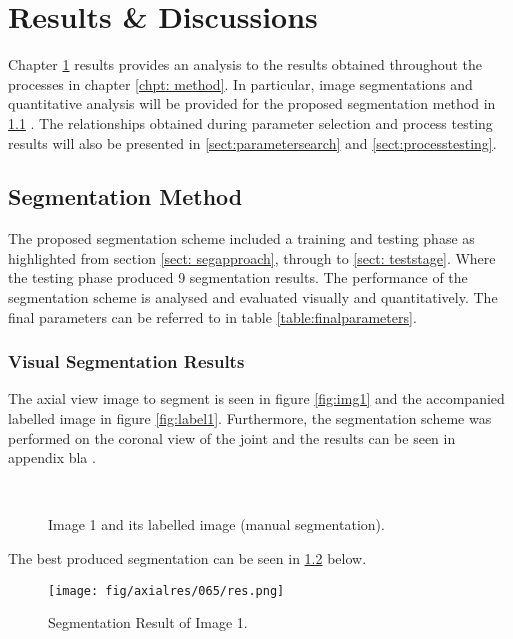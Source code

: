 \chapter{Results \& Discussions}
\label{chpt: results}
Chapter \ref{chpt: results} results provides an analysis to the results obtained throughout the processes in chapter \ref{chpt: method}. In particular, image segmentations and quantitative analysis  will be provided for the proposed segmentation method in \ref{sect:segmentationmethod} . The relationships obtained during parameter selection and process testing results will also be presented in 
\ref{sect:parametersearch} and \ref{sect:processtesting}.

\section{Segmentation Method}
\label{sect:segmentationmethod}
The proposed segmentation scheme included a training and testing phase as highlighted from section \ref{sect: segapproach}, through to \ref{sect: teststage}. Where the testing phase produced 9 segmentation results. The performance of the segmentation scheme is analysed and evaluated visually and quantitatively. The final parameters can be referred to in table \ref{table:finalparameters}.

\subsection{Visual Segmentation Results}
The axial view image to segment is seen in figure \ref{fig:img1} and the accompanied labelled image in figure \ref{fig:label1}. Furthermore, the segmentation scheme was performed on the coronal view of the joint and the results can be seen in appendix bla .

\begin{figure}[H]
    \centering
    \\
    \caption{Image 1 and its labelled image (manual segmentation).}%
    \label{fig:image1}
\end{figure}

The best produced segmentation can be seen in \ref{fig:res1} below.

\begin{figure}[H]
\centering
\texttt{[image: fig/axialres/065/res.png]}
\caption{Segmentation Result of Image 1.}
\label{fig:res1}
\end{figure}

